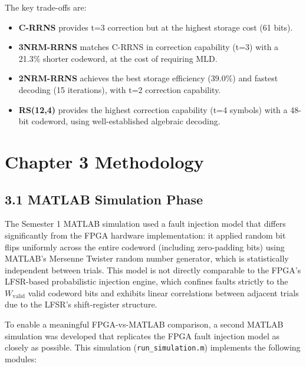 \documentclass[
  english,
  12pt,
]{report}
\providecommand{\tightlist}{%
  \setlength{\itemsep}{0pt}\setlength{\parskip}{0pt}}
\begin{document}
The key trade-offs are:

\begin{itemize}
\tightlist
\item
  \textbf{C-RRNS} provides t=3 correction but at the highest storage
  cost (61 bits).
\item
  \textbf{3NRM-RRNS} matches C-RRNS in correction capability (t=3) with
  a 21.3\% shorter codeword, at the cost of requiring MLD.
\item
  \textbf{2NRM-RRNS} achieves the best storage efficiency (39.0\%) and
  fastest decoding (15 iterations), with t=2 correction capability.
\item
  \textbf{RS(12,4)} provides the highest correction capability (t=4
  symbols) with a 48-bit codeword, using well-established algebraic
  decoding.
\end{itemize}

\chapter{Chapter 3 Methodology}\label{chapter-3-methodology}

\section{3.1 MATLAB Simulation Phase}\label{matlab-simulation-phase}

The Semester 1 MATLAB simulation used a fault injection model that
differs significantly from the FPGA hardware implementation: it applied
random bit flips uniformly across the entire codeword (including
zero-padding bits) using MATLAB's Mersenne Twister random number
generator, which is statistically independent between trials. This model
is not directly comparable to the FPGA's LFSR-based probabilistic
injection engine, which confines faults strictly to the
\(W_{\text{valid}}\) valid codeword bits and exhibits linear
correlations between adjacent trials due to the LFSR's shift-register
structure.

To enable a meaningful FPGA-vs-MATLAB comparison, a second MATLAB
simulation was developed that replicates the FPGA fault injection model
as closely as possible. This simulation (\texttt{run\_simulation.m})
implements the following modules:
\end{document}
